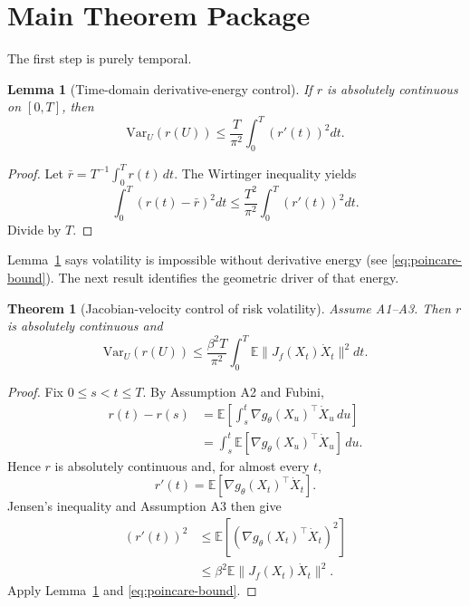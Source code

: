 \documentclass[conference]{IEEEtran}
\newtheorem{lemma}{Lemma}
\newtheorem{theorem}{Theorem}
\newcommand{\E}{\mathbb{E}}
\newcommand{\Var}{\mathrm{Var}}
\begin{document}
\section{Main Theorem Package}
The first step is purely temporal.

\begin{lemma}[Time-domain derivative-energy control]
\label{lem:poincare}
If $r$ is absolutely continuous on $[0,T]$, then
\begin{equation}
\label{eq:poincare-bound}
\Var_U(r(U)) \le \frac{T}{\pi^2}\int_0^T (r'(t))^2dt.
\end{equation}
\end{lemma}

\begin{proof}
Let $\bar r=T^{-1}\int_0^T r(t)\,dt$. The Wirtinger inequality yields
\[
\int_0^T (r(t)-\bar r)^2dt \le \frac{T^2}{\pi^2}\int_0^T (r'(t))^2dt.
\]
Divide by $T$.
\end{proof}

Lemma~\ref{lem:poincare} says volatility is impossible without derivative energy (see \eqref{eq:poincare-bound}). The next result identifies the geometric driver of that energy.

\begin{theorem}[Jacobian-velocity control of risk volatility]
\label{thm:jv}
Assume A1--A3. Then $r$ is absolutely continuous and
\begin{equation}
\label{eq:jv-bound}
\Var_U(r(U)) \le \frac{\beta^2 T}{\pi^2}\int_0^T \E\|J_f(X_t)\dot X_t\|^2dt.
\end{equation}
\end{theorem}

\begin{proof}
Fix $0\le s<t\le T$. By Assumption A2 and Fubini,
\begin{align*}
r(t)-r(s)
&=
\E\!\left[\int_s^t \nabla g_\theta(X_u)^\top \dot X_u\,du\right] \\
&=
\int_s^t \E[\nabla g_\theta(X_u)^\top \dot X_u]\,du.
\end{align*}
Hence $r$ is absolutely continuous and, for almost every $t$,
\[
r'(t)=\E[\nabla g_\theta(X_t)^\top \dot X_t].
\]
Jensen's inequality and Assumption A3 then give
\[
\begin{aligned}
(r'(t))^2
&\le \E[(\nabla g_\theta(X_t)^\top \dot X_t)^2] \\
&\le \beta^2 \E\|J_f(X_t)\dot X_t\|^2.
\end{aligned}
\]
Apply Lemma~\ref{lem:poincare} and \eqref{eq:poincare-bound}.
\end{proof}
\end{document}
